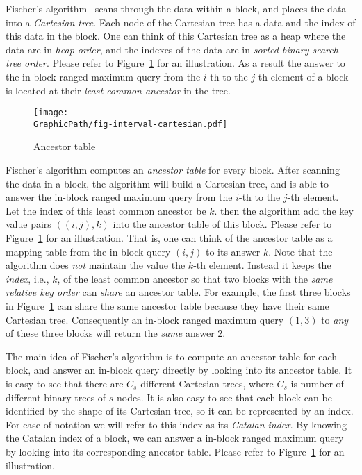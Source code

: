 Fischer's algorithm~\cite{Fischer2006TheoreticalAP} scans through the
data within a block, and places the data into a {\em Cartesian tree}.
Each node of the Cartesian tree has a data and the index of this data
in the block.  One can think of this Cartesian tree as a heap where
the data are in {\em heap order}, and the indexes of the data are in
{\em sorted binary search tree order}.  Please refer to
Figure~\ref{fig:ancesstor-cartesian} for an illustration.  As a result
the answer to the in-block ranged maximum query from the $i$-th to the
$j$-th element of a block is located at their {\em least common
  ancestor} in the tree.

\begin{figure}[htbp]   
  \centering
  \texttt{[image: \\GraphicPath/fig-interval-cartesian.pdf]}
  \caption{Ancestor table}
  \label{fig:ancesstor-cartesian}
\end{figure}

Fischer's algorithm computes an {\em ancestor table} for every block.
After scanning the data in a block, the algorithm will build a
Cartesian tree, and is able to answer the in-block ranged maximum
query from the $i$-th to the $j$-th element.  Let the index of this
least common ancestor be $k$. then the algorithm add the key value
pairs $((i, j), k)$ into the ancestor table of this block.  Please
refer to Figure~\ref{fig:ancesstor-cartesian} for an illustration.
That is, one can think of the ancestor table as a mapping table from
the in-block query $(i, j)$ to its answer $k$.  Note that the
algorithm does {\em not} maintain the value the $k$-th element.
Instead it keeps the {\em index}, i.e., $k$, of the least common
ancestor so that two blocks with the {\em same relative key order} can
{\em share} an ancestor table.  For example, the first three blocks in
Figure~\ref{fig:ancesstor-cartesian} can share the same ancestor table
because they have their same Cartesian tree.  Consequently an in-block
ranged maximum query $(1, 3)$ to {\em any} of these three blocks will
return the {\em same} answer $2$.

The main idea of Fischer's algorithm is to compute an ancestor table
for each block, and answer an in-block query directly by looking into
its ancestor table.  It is easy to see that there are $C_s$ different
Cartesian trees, where $C_s$ is number of different binary trees of
$s$ nodes.  It is also easy to see that each block can be identified
by the shape of its Cartesian tree, so it can be represented by an
index.  For ease of notation we will refer to this index as its {\em
  Catalan index}.  By knowing the Catalan index of a block, we can
answer a in-block ranged maximum query by looking into its
corresponding ancestor table.  Please refer to
Figure~\ref{fig:ancesstor-cartesian} for an illustration.

